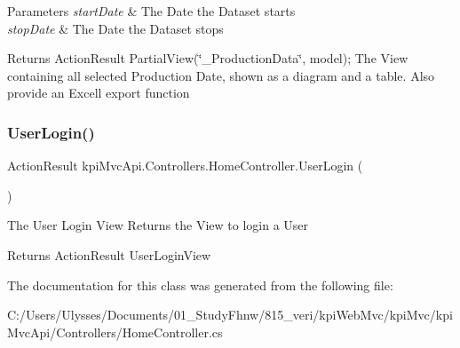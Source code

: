 \begin{DoxyParams}{Parameters}
{\em start\+Date} & The Date the Dataset starts\\
\hline
{\em stop\+Date} & The Date the Dataset stops \\
\hline
\end{DoxyParams}
\begin{DoxyReturn}{Returns}
{\ttfamily Action\+Result Partial\+View(\char`\"{}\+\_\+\+Production\+Data\char`\"{}, model);} The View containing all selected Production Date, shown as a diagram and a table. Also provide an Excell export function 
\end{DoxyReturn}
\mbox{\label{classkpi_mvc_api_1_1_controllers_1_1_home_controller_a52ba84d65a16f3ec9f7c18ef46313b23}} 
\subsubsection{\texorpdfstring{User\+Login()}{UserLogin()}}
{\footnotesize\ttfamily Action\+Result kpi\+Mvc\+Api.\+Controllers.\+Home\+Controller.\+User\+Login (\begin{DoxyParamCaption}{ }\end{DoxyParamCaption})\hspace{0.3cm}{\ttfamily [inline]}}



The User Login View Returns the View to login a User 

\begin{DoxyReturn}{Returns}
Action\+Result User\+Login\+View
\end{DoxyReturn}


The documentation for this class was generated from the following file\+:\begin{DoxyCompactItemize}
\item 
C\+:/\+Users/\+Ulysses/\+Documents/01\+\_\+\+Study\+Fhnw/815\+\_\+veri/kpi\+Web\+Mvc/kpi\+Mvc/kpi\+Mvc\+Api/\+Controllers/Home\+Controller.\+cs\end{DoxyCompactItemize}
